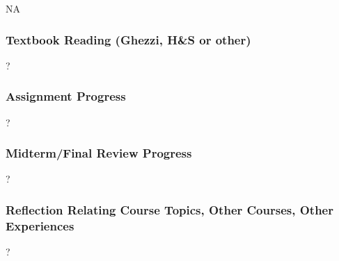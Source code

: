\documentclass[12pt]{article}
\begin{document}
NA

\subsubsection *{Textbook Reading (Ghezzi, H\&S or other)}

?

\subsubsection *{Assignment Progress}

?

\subsubsection *{Midterm/Final Review Progress}

?

\subsubsection *{Reflection Relating Course Topics, Other Courses, Other Experiences}

?

\end{document}
